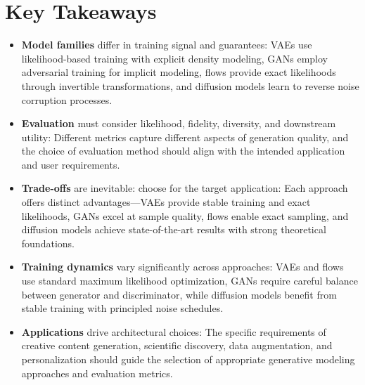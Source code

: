 
\section*{Key Takeaways}

\begin{keytakeaways}
\begin{itemize}[leftmargin=2em]
    \item \textbf{Model families} differ in training signal and guarantees: VAEs use likelihood-based training with explicit density modeling, GANs employ adversarial training for implicit modeling, flows provide exact likelihoods through invertible transformations, and diffusion models learn to reverse noise corruption processes.
    \item \textbf{Evaluation} must consider likelihood, fidelity, diversity, and downstream utility: Different metrics capture different aspects of generation quality, and the choice of evaluation method should align with the intended application and user requirements.
    \item \textbf{Trade-offs} are inevitable: choose for the target application: Each approach offers distinct advantages—VAEs provide stable training and exact likelihoods, GANs excel at sample quality, flows enable exact sampling, and diffusion models achieve state-of-the-art results with strong theoretical foundations.
    \item \textbf{Training dynamics} vary significantly across approaches: VAEs and flows use standard maximum likelihood optimization, GANs require careful balance between generator and discriminator, while diffusion models benefit from stable training with principled noise schedules.
    \item \textbf{Applications} drive architectural choices: The specific requirements of creative content generation, scientific discovery, data augmentation, and personalization should guide the selection of appropriate generative modeling approaches and evaluation metrics.
\end{itemize}
\end{keytakeaways}


